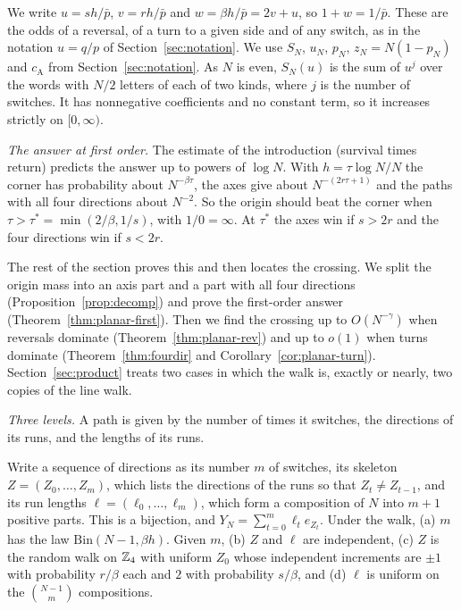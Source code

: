We write $u=sh/\bar p$, $v=rh/\bar p$ and $w=\beta h/\bar p=2v+u$, so $1+w=1/\bar p$. These
are the odds of a reversal, of a turn to a given side and of any switch, as in
the notation $u=q/p$ of Section~\ref{sec:notation}. We use $S_N$, $u_N$, $p_N$, $z_N=N(1-p_N)$ and
$c_{\mathrm A}$ from Section~\ref{sec:notation}. As $N$ is even, $S_N(u)$ is the sum of
$u^j$ over the words with $N/2$ letters of each of two kinds, where $j$ is the
number of switches. It has nonnegative coefficients and no constant term, so it
increases strictly on $[0,\infty)$.

\emph{The answer at first order.} The estimate of the introduction (survival
times return) predicts the answer up to powers of $\log N$. With
$h=\tau\log N/N$ the corner has probability about $N^{-\beta\tau}$, the axes give
about $N^{-(2r\tau+1)}$ and the paths with all four directions about $N^{-2}$.
So the origin should beat the corner when $\tau>\tau^*=\min(2/\beta,1/s)$, with
$1/0=\infty$. At $\tau^*$ the axes win if $s>2r$ and the four directions win if
$s<2r$.

The rest of the section proves this and then locates the crossing. We split
the origin mass into an axis part and a part with all four directions
(Proposition~\ref{prop:decomp}) and prove the first-order answer
(Theorem~\ref{thm:planar-first}). Then we find the crossing up to
$O(N^{-\gamma})$ when reversals dominate (Theorem~\ref{thm:planar-rev}) and up
to $o(1)$ when turns dominate (Theorem~\ref{thm:fourdir} and
Corollary~\ref{cor:planar-turn}). Section~\ref{sec:product} treats two cases in
which the walk is, exactly or nearly, two copies of the line walk.

\emph{Three levels.} A path is given by the number of times it switches, the
directions of its runs, and the lengths of its runs.

\begin{lemma}\label{lem:threelevel}
Write a sequence of directions as its number $m$ of switches, its skeleton $Z=(Z_0,\dots,Z_m)$,
which lists the directions of the runs so that $Z_t\ne Z_{t-1}$, and its run lengths
$\ell=(\ell_0,\dots,\ell_m)$, which form a composition of $N$ into $m+1$ positive parts. This is a
bijection, and $Y_N=\sum_{t=0}^m\ell_te_{Z_t}$. Under the walk, \textup{(a)} $m$ has the law
$\mathrm{Bin}(N-1,\beta h)$. Given $m$, \textup{(b)} $Z$ and $\ell$ are independent, \textup{(c)}
$Z$ is the random walk on $\mathbb{Z}_4$ with uniform $Z_0$ whose independent increments are $\pm1$ with
probability $r/\beta$ each and $2$ with probability $s/\beta$, and \textup{(d)} $\ell$ is uniform on
the $\binom{N-1}m$ compositions.
\end{lemma}

